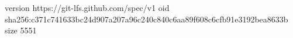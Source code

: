 version https://git-lfs.github.com/spec/v1
oid sha256:c371c741633bc24d907a207a96c240c840c6aa89f608c6cfb91e3192bea8633b
size 5551
